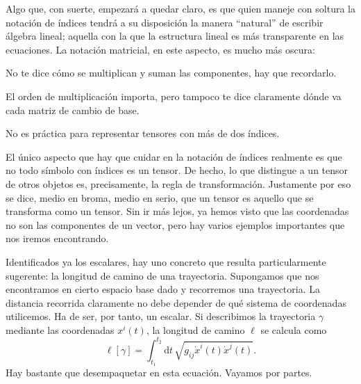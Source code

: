 Algo que, con suerte, empezará a quedar claro, es que quien maneje con soltura la notación de índices tendrá a su disposición la manera ``natural'' de escribir álgebra lineal; aquella con la que la estructura lineal es más transparente en las ecuaciones. La notación matricial, en este aspecto, es mucho más oscura:
\begin{myitemize}
    \item No te dice cómo se multiplican y suman las componentes, hay que recordarlo. 
    \item El orden de multiplicación importa, pero tampoco te dice claramente dónde va cada matriz de cambio de base. 
    \item No es práctica para representar tensores con más de dos índices.
\end{myitemize}
El único aspecto que hay que cuidar en la notación de índices realmente es que no todo símbolo con índices es un tensor. De hecho, lo que distingue a un tensor de otros objetos es, precisamente, la regla de transformación. Justamente por eso se dice, medio en broma, medio en serio, que un tensor es aquello que se transforma como un tensor. Sin ir más lejos, ya hemos visto que las coordenadas no son las componentes de un vector, pero hay varios ejemplos importantes que nos iremos encontrando.

Identificados ya los escalares, hay uno concreto que resulta particularmente sugerente: la longitud de camino de una trayectoria. Supongamos que nos encontramos en cierto espacio base dado y recorremos una trayectoria. La distancia recorrida claramente no debe depender de qué sistema de coordenadas utilicemos. Ha de ser, por tanto, un escalar. Si describimos la trayectoria \(\gamma\) mediante las coordenadas \(x^i(t)\), la longitud de camino \(\ell\) se calcula como
\begin{equation}
    \label{eq.1-longitud_camino}
    \ell[\gamma] = \int_{t_1}^{t_2} \mathrm{d}t\, \sqrt{g_{ij}\dot{x}^i(t)\dot{x}^j(t)}.
\end{equation}
Hay bastante que desempaquetar en esta ecuación. Vayamos por partes.

